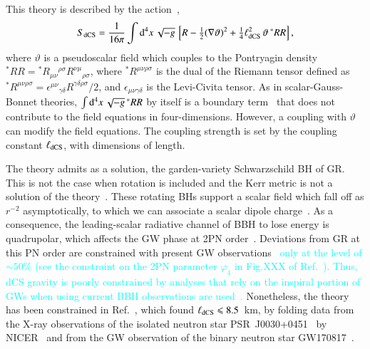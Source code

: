 \documentclass[twocolumn,
               prd,
               aps,
               superscriptaddress,
               tightenlines,
               nofootinbib,
               eqsecnum,
               amsfonts,
               amsmath,
               longbibliography]{revtex4-1}
\newcommand{\dV}{{\rm d}^{4}x \, \sqrt{-g} \,}
\newcommand{\ab}[1]{{\textcolor{cyan}{{#1}}}}
\begin{document}
This theory is described by the action~\cite{Jackiw:2003pm,Alexander:2009tp},
%
\begin{align} \label{eq:action_dcs}
    S_{\rm dCS} = \frac{1}{16 \pi}
    \int \dV
    \left[
    R - \tfrac{1}{2}(\nabla \vartheta)^2
    + \tfrac{1}{4} \ell^{2}_{\rm dCS} \, \vartheta \, {}^{*}RR
    \right],
    \nonumber \\
\end{align}
%
where $\vartheta$ is a pseudoscalar field which couples to the Pontryagin
density
${}^{*}RR = {}^{*}R_{\mu\nu}{}^{\rho\sigma} R^{\nu\mu}{}_{\rho\sigma}$,
%
where ${}^{*}R^{\mu\nu\rho\sigma}$ is the dual of the Riemann tensor
defined as
%
${}^{*}R^{\mu\nu\rho\sigma} =
\epsilon^{\mu\nu}{}_{\gamma\delta}
R^{\gamma\delta\rho\sigma} / 2$,
%
and $\epsilon_{\mu\nu\gamma\delta}$ is the Levi-Civita tensor.
%
As in scalar-Gauss-Bonnet theories, $\int \dV {}^{*}RR$ by itself is a boundary
term~\cite{Jackiw:2003pm} that does not contribute to the field equations in
four-dimensions.
%
However, a coupling with $\vartheta$ can modify the field equations.
%
The coupling strength is set by the coupling constant $\ell_{\rm dCS}$, with
dimensions of length.

The theory admits as a solution, the garden-variety Schwarzschild BH of GR. This
is not the case when rotation is included and the Kerr metric is not a solution of
the theory~\cite{Jackiw:2003pm}.
%
These rotating BHs support a scalar field which fall off as
$r^{-2}$ asymptotically, to which we can associate a scalar dipole
charge~\cite{Yunes:2009hc,Konno:2009kg}.
%
As a consequence, the leading-scalar radiative channel of BBH to lose energy is quadrupolar,
which affects the GW phase at 2PN order~\cite{Yagi:2011xp,Alexander:2017jmt}.
%
Deviations from GR at this PN order are constrained with present GW observations~\cite{LIGOScientific:2021sio}
\ab{only at the level of $\sim 50\%$ (see the constraint on the 2PN parameter $\varphi_4$ in Fig.XXX of
Ref.~\cite{LIGOScientific:2021sio}). Thus, dCS gravity is poorly constrained by
analyses that rely on the inspiral portion of GWs when using current BBH observations are used~\cite{Nair:2019iur,Perkins:2021mhb}.}
%
Nonetheless, the theory has been constrained in Ref.~\cite{Silva:2020acr}, which found
%
$\ell_{\rm dCS} \leqslant 8.5$~km,
%
by folding data from the X-ray observations of the isolated neutron star
PSR~J0030+0451~\cite{Lommen:2000yt,NANOGrav:2017wvv} by
NICER~\cite{Riley:2019yda,Miller:2019cac} and from the GW observation of the binary
neutron star GW170817~\cite{TheLIGOScientific:2017qsa,LIGOScientific:2018cki}.
\end{document}
